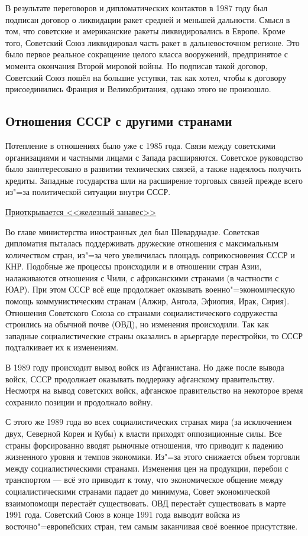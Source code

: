 В результате переговоров и дипломатических контактов в 1987 году был подписан договор о ликвидации ракет средней и меньшей дальности. Смысл в том, что советские и американские ракеты ликвидировались в Европе. Кроме того, Советский Союз ликвидировал часть ракет в дальневосточном регионе. Это было первое реальное сокращение целого класса вооружений, предпринятое с момента окончания Второй мировой войны. Но подписав такой договор, Советский Союз пошёл на большие уступки, так как хотел, чтобы к договору присоединились Франция и Великобритания, однако этого не произошло.

\subsection{Отношения СССР с другими странами}
Потепление в отношениях было уже с 1985 года. Связи между советскими организациями и частными лицами с Запада расширяются. Советское руководство было заинтересовано в развитии технических связей, а также надеялось получить кредиты. Западные государства шли на расширение торговых связей прежде всего из"=за политической ситуации внутри СССР.

\underline{Приоткрывается <<железный занавес>>}

Во главе министерства иностранных дел был Шеварднадзе. Советская дипломатия пыталась поддерживать дружеские отношения с максимальным количеством стран, из"=за чего увеличилась площадь соприкосновения СССР и КНР. Подобные же процессы происходили и в отношении стран Азии, налаживаются отношения с Чили, с африканскими странами (в частности с ЮАР). При этом СССР всё еще продолжает оказывать военно"=экономическую помощь коммунистическим странам (Алжир, Ангола, Эфиопия, Ирак, Сирия). Отношения Советского Союза со странами социалистического содружества строились на обычной почве (ОВД), но изменения происходили. Так как западные социалистические страны оказались в арьергарде перестройки, то СССР подталкивает их к изменениям.

В 1989 году происходит вывод войск из Афганистана. Но даже после вывода войск, СССР продолжает оказывать поддержку афганскому правительству. Несмотря на вывод советских войск, афганское правительство на некоторое время сохранило позиции и продолжало войну.

С этого же 1989 года во всех социалистических странах мира (за исключением двух, Северной Кореи и Кубы) к власти приходят оппозиционные силы. Все страны форсированно вводят рыночные отношения, что приводит к падению жизненного уровня и темпов экономики. Из"=за этого снижается объем торговли между социалистическими странами. Изменения цен на продукции, перебои с транспортом --- всё это приводит к тому, что экономическое общение между социалистическими странами падает до минимума, Совет экономической взаимопомощи перестаёт существовать. ОВД перестаёт существовать в марте 1991 года. Советский Союз в конце 1991 года выводит войска из восточно"=европейских стран, тем самым заканчивая своё военное присутствие. 

